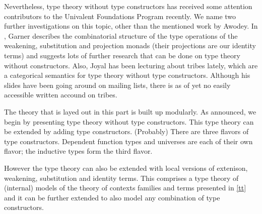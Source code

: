 \documentclass{article}
\begin{document}
Nevertheless, type theory without type constructors has received some attention
contributors to the Univalent Foundations Program recently. We name two
further investigations on this topic, other than the mentioned work by Awodey.
In \cite{Garner2014}, Garner describes the combinatorial structure
of the type operations of the weakening, substitution and projection monads
(their projections are our identity terms) and suggests lots of further research
that can be done on type theory without constructors. Also, Joyal has been
lecturing about tribes lately, which are a categorical semantics for type theory
without type constructors. Although his slides have been going around on
mailing lists, there is as of yet no easily accessible written accound on tribes.

The theory that is layed out in this part is built up modularly. As announced,
we begin by presenting type theory without type constructors. This type theory
can be extended by adding type constructors. (Probably) There are three flavors
of type constructors. Dependent function types and universes are each of their
own flavor; the inductive types form the third flavor.

However the type theory can also be extended with local versions of extenison,
weakening, substitution and identity terms. This comprises a type theory of
(internal) models of the theory of contexts families and terms presented in
\autoref{tt} and it can be further extended to also model any combination of
type constructors.











%

%

%



\end{document}
